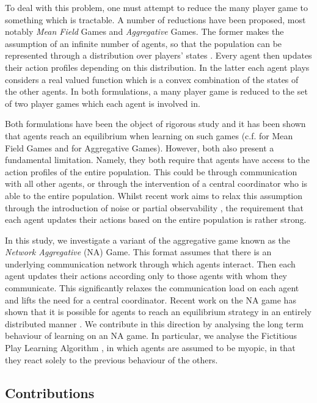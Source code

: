 \documentclass{article}
\theoremstyle{definition}
\begin{document}
To deal with this problem, one must attempt to reduce the many player game to something which is
tractable. A number of reductions have been proposed, most notably \emph{Mean Field} Games
and \emph{Aggregative} Games. The former makes the assumption of an infinite
number of agents, so that the population can be represented through a distribution over players'
states \cite{CainesPaper} . Every agent then updates their action profiles depending on this
distribution. In the latter each agent plays considers a real valued function which is a convex
combination of the states of the other agents. In both formulations, a many player game is reduced
to the set of two player games which each agent is involved in.

Both formulations have been the object of rigorous study and it has been shown that agents reach an equilibrium when learning on such games (c.f. \cite{MFGLearningPapers} for Mean Field Games and
\cite{Aggregative Papers} for Aggregative Games). However, both also present a fundamental limitation.
Namely, they both require that agents have access to the action profiles of the entire population.
This could be through communication with all other agents, or through the intervention of a central
coordinator who is able to the entire population. Whilst recent work aims to relax this assumption
through the introduction of noise \cite{MFG-FP} or partial observability \cite{AAMASPaper}, the
requirement that each agent updates their actions based on the entire population is rather strong.

In this study, we investigate a variant of the aggregative game known as the \emph{Network
Aggregative} (NA) Game. This format assumes that there is an underlying communication network
through which agents interact. Then each agent updates their actions according only to those agents
with whom they communicate. This significantly relaxes the communication load on each agent and
lifts the need for a central coordinator. Recent work on the NA game has shown that it is possible
for agents to reach an equilibrium strategy in an entirely distributed manner \cite{Grammatico,
LeaderFollower, MyopicAgents}. We contribute in this direction by analysing the long term behaviour of learning on an NA game. In particular, we analyse the Fictitious Play Learning
Algorithm \cite{Brown, Harris}, in which agents are assumed to be myopic, in that they react solely
to the previous behaviour of the others.


\subsection{Contributions}
\end{document}
